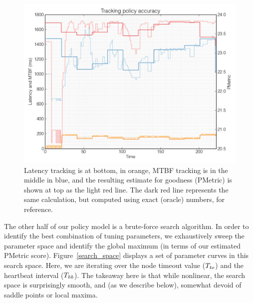 \begin{figure}[htbp]
\begin{center}
\includegraphics[width=\columnwidth]{track_policy_final}
\caption{Latency tracking is at bottom, in orange, MTBF tracking is in the middle in blue, and the resulting estimate for goodness (PMetric) is shown at top as the light red line. The dark red line represents the same calculation, but computed using exact (oracle) numbers, for reference.}
\label{track_policy}
\end{center}
\end{figure}

The other half of our policy model is a brute-force search algorithm.
In order to identify the best combination of tuning parameters, we exhaustively sweep the parameter space and identify the global maximum (in terms of our estimated PMetric score).
Figure~\ref{search_space} displays a set of parameter curves in this search space.
Here, we are iterating over the node timeout value ($T_{\mathit{to}}$) and the heartbeat interval ($T_{\mathit{hb}}$).
The takeaway here is that while nonlinear, the search space is surprisingly smooth, and (as we describe below), somewhat devoid of saddle points or local maxima.

